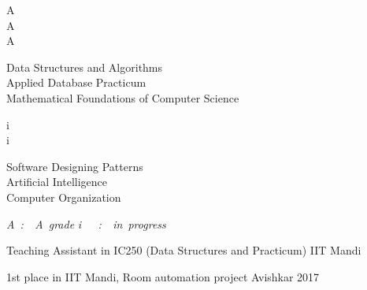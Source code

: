 \documentclass[]{awesome-cv}
\begin{document}
\vspace{-3mm}

\vspace{-5mm}
\begin{cvhonors}
	\begin{minipage}[t]{0.05\textwidth}
		A\\
		A\\
		A
	\end{minipage}\begin{minipage}[t]{0.45\textwidth}
		 Data Structures and Algorithms\\	
		 Applied Database Practicum\\	
		 Mathematical Foundations of Computer Science	
	\end{minipage}\begin{minipage}[t]{0.05\textwidth}
		i\\
		i\\
	\end{minipage}\begin{minipage}[t]{0.45\textwidth}
		Software Designing Patterns\\
		Artificial Intelligence\\	
		Computer Organization\\	
	\end{minipage}	

\color[HTML]{b30000}
\textit{A~:~~A~grade }
\textit{i~~~:~~in~progress}  
	
\end{cvhonors}




\vspace{-5mm}
\begin{cventries}
	\cventry
	{Teaching Assistant in IC250 (Data Structures and Practicum)}
	{IIT Mandi}
	{}
	{}
	{}	
\end{cventries}
\vspace{-5mm}
\begin{cventries}
	\cventry
	{1st place in IIT Mandi, Room automation project}
	{Avishkar 2017}
	{}
	{}
	{}	
\end{cventries}


\ 
\end{document}
